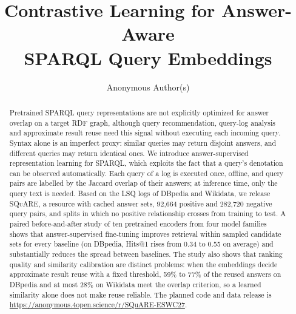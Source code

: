 \documentclass[runningheads]{llncs}
\newcommand{\squareds}{\textsc{SQuARE}}
\begin{document}
\title{Contrastive Learning for Answer-Aware\\SPARQL Query Embeddings}


\author{Anonymous Author(s)}

\maketitle

\begin{abstract}
Pretrained SPARQL query representations are not explicitly optimized for
answer overlap on a target RDF graph, although query recommendation,
query-log analysis and approximate result reuse need this signal without
executing each incoming query. Syntax alone is an imperfect proxy: similar queries may return disjoint answers, and different queries may
return identical ones. We introduce answer-supervised representation learning
for SPARQL, which exploits the fact that a query's denotation can be observed
automatically. Each query of a log is executed once, offline, and query pairs
are labelled by the Jaccard overlap of their answers; at inference time, only
the query text is needed. Based on the LSQ logs of DBpedia and Wikidata, we
release \squareds{}, a resource with cached answer sets, 92{,}664 positive and
282{,}720 negative query pairs, and splits in which no positive relationship
crosses from training to test. A paired before-and-after study of ten pretrained encoders from four model families shows that answer-supervised fine-tuning improves retrieval within sampled candidate sets for every baseline (on DBpedia, Hits@1 rises from 0.34 to 0.55 on
average) and substantially reduces the spread between baselines. The study
also shows that ranking quality and similarity calibration are distinct
problems: when the embeddings decide approximate result reuse with a fixed
threshold, 59\% to 77\% of the reused answers on DBpedia and at most 28\% on
Wikidata meet the overlap criterion, so a learned similarity alone does not
make reuse reliable. The planned code and data release is \url{https://anonymous.4open.science/r/SQuARE-ESWC27}.

\end{abstract}
\end{document}
